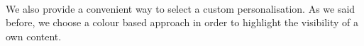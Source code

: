 \documentclass[]{usiinfbachelorproject}
\begin{document}
\begin{figure}[H]
  \centering
   \
  \
  \
\end{figure}
We also provide a convenient way to select a custom personalisation. As we said before, we choose a colour based approach in order to highlight the visibility of a own content.
\end{document}
